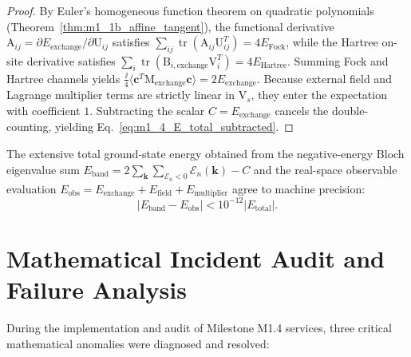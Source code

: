 \begin{proof}
By Euler's homogeneous function theorem on quadratic polynomials (Theorem~\ref{thm:m1_1b_affine_tangent}), the functional derivative $\mathrm{A}_{ij} = \partial E_{\mathrm{exchange}}/\partial \mathrm{U}_{ij}$ satisfies $\sum_{ij} \operatorname{tr}(\mathrm{A}_{ij} \mathrm{U}_{ij}^T) = 4 E_{\mathrm{Fock}}$, while the Hartree on-site derivative satisfies $\sum_i \operatorname{tr}(\mathrm{B}_{i, \mathrm{exchange}} \mathrm{V}_i^T) = 4 E_{\mathrm{Hartree}}$. Summing Fock and Hartree channels yields $\frac{\ii}{4}\langle \mathbf{c}^T \mathrm{M}_{\mathrm{exchange}} \mathbf{c} \rangle = 2 E_{\mathrm{exchange}}$. Because external field and Lagrange multiplier terms are strictly linear in $\mathrm{V}_s$, they enter the expectation with coefficient $1$. Subtracting the scalar $C = E_{\mathrm{exchange}}$ cancels the double-counting, yielding Eq.~\eqref{eq:m1_4_E_total_subtracted}.
\end{proof}

\begin{corollary}
\label{cor:m1_4_energy_consistency}
The extensive total ground-state energy obtained from the negative-energy Bloch eigenvalue sum $E_{\mathrm{band}} = 2 \sum_{\mathbf{k}} \sum_{\mathcal{E}_n < 0} \mathcal{E}_n(\mathbf{k}) - C$ and the real-space observable evaluation $E_{\mathrm{obs}} = E_{\mathrm{exchange}} + E_{\mathrm{field}} + E_{\mathrm{multiplier}}$ agree to machine precision:
\begin{equation}
\label{eq:m1_4_energy_consistency_tol}
|E_{\mathrm{band}} - E_{\mathrm{obs}}| < 10^{-12} |E_{\mathrm{total}}|.
\end{equation}
\end{corollary}

\section{Mathematical Incident Audit and Failure Analysis}
\label{sec:m1_4_incident_audit}
During the implementation and audit of Milestone M1.4 services, three critical mathematical anomalies were diagnosed and resolved:

